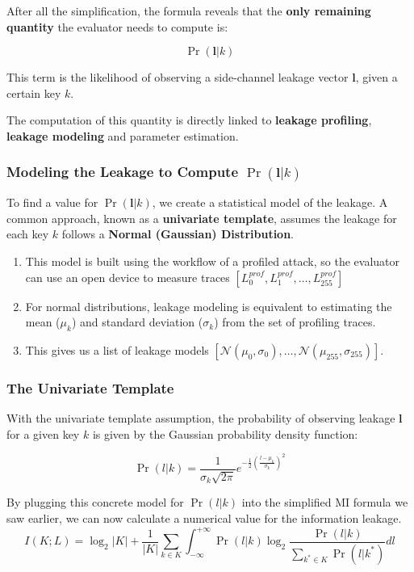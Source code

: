 \begin{frame}
    \frametitle{}
    
    \begin{alertblock}{}
        After all the simplification, the formula reveals that the \textbf{only remaining quantity} the evaluator needs to compute is:
        
  
        $$\Pr(\mathbf{l}|k)$$
        
   
        This term is the likelihood of observing a side-channel leakage vector $\mathbf{l}$, given a certain key $k$.
    \end{alertblock}
    
    \begin{block}{}
        The computation of this quantity is directly linked to \textbf{leakage profiling}, \textbf{leakage modeling} and parameter estimation.
    \end{block}
\end{frame}

\begin{frame}
    \frametitle{Modeling the Leakage to Compute $\Pr(\mathbf{l}|k)$}
    
        To find a value for $\Pr(\mathbf{l}|k)$, we create a statistical model of the leakage. A common approach, known as a \textbf{univariate template}, assumes the leakage for each key $k$ follows a \textbf{Normal (Gaussian) Distribution}.
        
        \begin{enumerate}
            \item This model is built using the workflow of a profiled attack, so the evaluator can use an open device to measure traces $[L_0^{prof},L_1^{prof},\dots,L_{255}^{prof}]$
            \item For normal distributions, leakage modeling is equivalent to estimating the mean ($\mu_k$) and standard deviation ($\sigma_k$) from the set of profiling traces.
            \item This gives us a list of leakage models $[\mathcal{N}(\mu_0, \sigma_0), \dots, \mathcal{N}(\mu_{255}, \sigma_{255})]$.
        \end{enumerate}
\end{frame}

\begin{frame}
    \frametitle{The Univariate Template}
    
    \begin{block}{}
        With the univariate template assumption, the probability of observing leakage $\mathbf{l}$ for a given key $k$ is given by the Gaussian probability density function:
        
        $$ \Pr(l|k) = \frac{1}{\sigma_k\sqrt{2\pi}} e^{ -\frac{1}{2} \left( \frac{l-\mu_k}{\sigma_k} \right)^2 } $$
    \end{block}
    
    By plugging this concrete model for $\Pr(l|k)$ into the simplified MI formula we saw earlier, we can now calculate a numerical value for the information leakage.
    $$I(K;L) = \log_2|K| + \frac{1}{|K|} \sum_{k \in K} \int_{-\infty}^{+\infty} \Pr(l|k) \log_2  \frac{\Pr(l|k)}{\sum_{k^* \in K} \Pr(l|k^*)}  dl $$
\end{frame}



